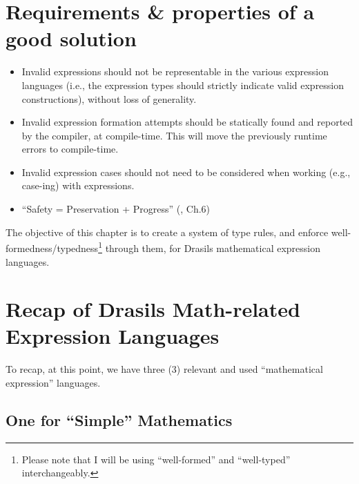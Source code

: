 \section{Requirements \& properties of a good solution}

\begin{itemize}

      \item Invalid expressions should not be representable in the various
            expression languages (i.e., the expression types should strictly
            indicate valid expression constructions), without loss of
            generality.

      \item Invalid expression formation attempts should be statically found and
            reported by the compiler, at compile-time. This will move the
            previously runtime errors to compile-time.

      \item Invalid expression cases should not need to be considered when
            working (e.g., case-ing) with expressions.

      \item ``Safety = Preservation + Progress'' (\cite{Harper2016}, Ch.6)

\end{itemize}








The objective of this chapter is to create a system of type rules, and enforce
well-formedness/typedness\footnote{Please note that I will be using
``well-formed'' and ``well-typed'' interchangeably.} through them, for Drasils
mathematical expression languages.

\section{Recap of Drasils Math-related Expression Languages}

To recap, at this point, we have three (3) relevant and used ``mathematical
expression'' languages.

\subsection{One for \textquotedblleft{}Simple\textquotedblright{} Mathematics}

